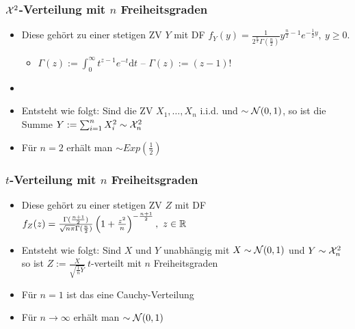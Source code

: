\subsubsection{$\mathcal{X}^2$-Verteilung mit $n$ Freiheitsgraden}
\begin{itemize}
    \item Diese gehört zu einer stetigen ZV $Y$ mit DF $f_Y(y) = \frac{1}{2^{\frac{n}{2}} \Gamma(\frac{n}{2})}y^{\frac{n}{2} - 1}e^{-\frac{1}{2}y}, \ y \ge 0$.
        \begin{itemize}
            \item $\Gamma(z) := \int_{0}^{\infty} t^{z - 1} e^{-t}\mathrm{d}t$  \quad -- $\Gamma(z) := (z - 1)!$
        \end{itemize}
    \item 
    \item Entsteht wie folgt: Sind die ZV $X_1, \dots, X_n$ i.i.d. und $\sim \mathcal{N}(0, 1)$, so ist die Summe $Y := \sum_{i=1}^{n} X_i^2 \sim \mathcal{X}_n^2$
        \\ 
    \item Für $n = 2$ erhält man $\sim Exp(\frac{1}{2})$
\end{itemize}

\subsubsection{$t$-Verteilung mit $n$ Freiheitsgraden}
\begin{itemize}
    \item Diese gehört zu einer stetigen ZV $Z$ mit DF $f_Z(z) = \frac{\Gamma(\frac{n + 1}{2})}{\sqrt{n \pi} \Gamma(\frac{n}{2})} \left( 1 + \frac{z^2}{n}\right)^{- \frac{n + 1}{2}}, \ z \in \mathbb{R}$
    \item Entsteht wie folgt: Sind $X$ und $Y$ unabhängig mit $X \sim \mathcal{N}(0, 1)$ und $Y \sim \mathcal{X}_n^2$ so ist $Z := \frac{X}{\sqrt{\frac{1}{n} Y}} \ t$-verteilt mit $n$ Freiheitsgraden
    \item Für $n = 1$ ist das eine Cauchy-Verteilung
    \item Für $n \to \infty$ erhält man $\sim \mathcal{N}(0, 1)$
\end{itemize}
